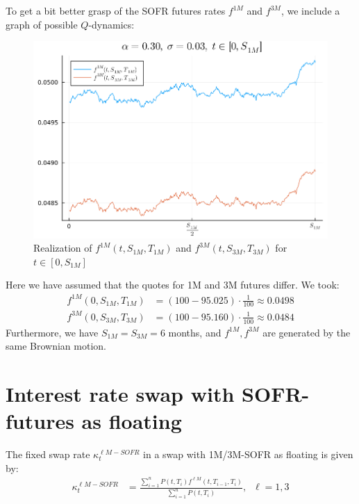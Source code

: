 To get a bit better grasp of the SOFR futures rates $f^{1M}$ and $f^{3M}$, we include a graph of possible $Q$-dynamics: 

\begin{figure}[htp]
    \centering
    \includegraphics[width=12cm]{figures/SOFR/1M_3M_futures_dynamics.PNG}
    \caption{Realization of $f^{1M}(t,S_{1M}, T_{1M})$ and $f^{3M}(t,S_{3M}, T_{3M})$ for $t\in [0,S_{1M}]$}
    \label{fig: 1M_3M_futures_dynamics}
\end{figure}


Here we have assumed that the quotes for 1M and 3M futures differ. We took: 
\begin{align*}
f^{1M}(0, S_{1M}, T_{1M}) &= (100-95.025)\cdot\frac{1}{100} \approx 0.0498 \\ 
f^{3M}(0, S_{3M}, T_{3M}) &= (100-95.160)\cdot\frac{1}{100} \approx 0.0484
\end{align*}
Furthermore, we have $S_{1M} = S_{3M} = 6$ months, and $f^{1M}, f^{3M}$ are generated by the same Brownian motion. 


\newpage 

\section{Interest rate swap with SOFR-futures as floating}


\begin{proposition}
The fixed swap rate $\kappa_{t}^{\ell M-SOFR}$ in a swap with 1M/3M-SOFR as floating is given by:  
\begin{align*}
 \kappa_{t}^{\ell M-SOFR} &= 
 \frac{
 \sum_{i=1}^{n}P(t,T_{i})f^{\ell M}(t,T_{i-1}, T_{i})
 }{
 \sum_{i=1}^{n}P(t,T_{i})
 }, \;\; \ell = 1,3
\end{align*}
\end{proposition}

